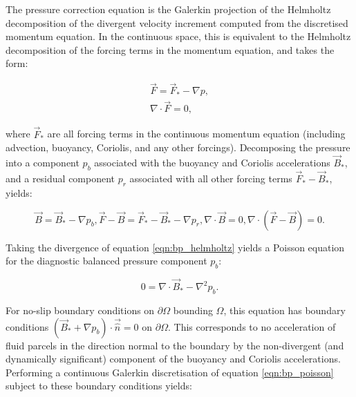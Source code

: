 The pressure correction equation is the Galerkin projection of the Helmholtz
decomposition of the divergent velocity increment computed from the discretised
momentum equation. In the continuous space, this is equivalent to the Helmholtz
decomposition of the forcing terms in the momentum equation, and takes the form:

\begin{align}
  \vec{F} = \vec{F}_* - \nabla p, \\
  \nabla \cdot \vec{F} = 0,
\end{align}

where $\vec{F}_*$ are all forcing terms in the continuous momentum equation
(including advection, buoyancy, Coriolis, and any other forcings).
Decomposing the pressure into a component $p_b$ associated with the buoyancy and
Coriolis accelerations $\vec{B}_*$, and a residual component $p_r$ associated with
all other forcing terms $\vec{F}_* - \vec{B}_*$, yields:

\begin{subequations}
  \begin{equation}\label{eqn:bp_helmholtz}
    \vec{B} = \vec{B}_* - \nabla p_b,
  \end{equation}
  \begin{equation}
    \vec{F} - \vec{B} = \vec{F}_* - \vec{B}_* - \nabla p_r,
  \end{equation}
  \begin{equation}
    \nabla \cdot \vec{B} = 0,
  \end{equation}
  \begin{equation}
    \nabla \cdot \left( \vec{F} - \vec{B} \right) = 0.
  \end{equation}
\end{subequations}

Taking the divergence of equation \eqref{eqn:bp_helmholtz} yields a Poisson equation for the diagnostic
balanced pressure component $p_b$:

\begin{equation}\label{eqn:bp_poisson}
  0 = \nabla \cdot \vec{B}_* - \nabla^2 p_b.
\end{equation}

For no-slip boundary conditions on $\partial \Omega$ bounding
$\Omega$, this equation has boundary conditions \linebreak
$\left( \vec{B}_* + \nabla p_b \right) \cdot \vec{\hat{n}} = 0$ on $\partial \Omega$. This corresponds
to no acceleration of fluid parcels in the direction normal to the boundary
by the non-divergent (and dynamically significant) component of the buoyancy
and Coriolis accelerations. Performing a continuous Galerkin discretisation of equation
\eqref{eqn:bp_poisson} subject to these boundary conditions yields:

